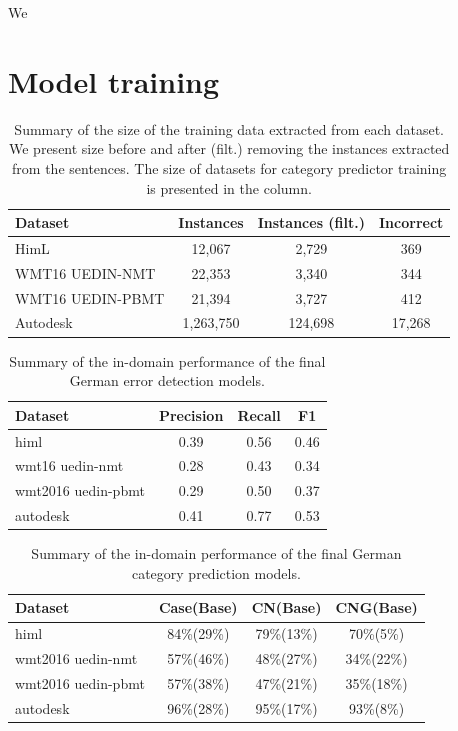 We

\section{Model training}

\begin{table}[t]
\centering
\small

\begin{tabular}{lccc}
Dataset  &  \hash{} Instances  &  \hash{} Instances (filt.)  &  \hash{} Incorrect  \\
\hline
HimL  & 12,067  &  2,729  &  369  \\
WMT16 UEDIN-NMT  &  22,353  &  3,340  &  344  \\
WMT16 UEDIN-PBMT  &  21,394  &   3,727  &  412  \\
Autodesk  &  1,263,750  &  124,698  &  17,268  \\
\end{tabular}
\caption{
    Summary of the size of the training data extracted from each dataset. We present
size before and after (filt.) removing the instances extracted from the  sentences.
The size of datasets for category predictor training is presented in the  column.
}
\label{wf-training-sum}
\end{table}


\begin{table}[t]
\centering
\small

\begin{tabular}{l|ccc}
Dataset  &  Precision  &  Recall  &  F1  \\
\hline
himl  &  0.39  &  0.56  &  0.46  \\
wmt16 uedin-nmt  &  0.28  &  0.43  &  0.34  \\
wmt2016 uedin-pbmt  &  0.29  &  0.50  &  0.37  \\
autodesk  &  0.41  &  0.77  &  0.53  \\
\end{tabular}
\caption{
    Summary of the in-domain performance of the final German error detection models.
}
\label{wf_de-summary}
\end{table}

\begin{table}[t]
\centering
\small

\begin{tabular}{l|ccc}
Dataset  &  Case(Base)  &  CN(Base)  & CNG(Base)  \\
\hline
himl  &  84\%(29\%)  &  79\%(13\%)  &  70\%(5\%)  \\
wmt2016 uedin-nmt  &  57\%(46\%)  &  48\%(27\%)  &  34\%(22\%)  \\
wmt2016 uedin-pbmt  &  57\%(38\%)  &  47\%(21\%)  &  35\%(18\%)\\
autodesk  &  96\%(28\%)  &  95\%(17\%)  &  93\%(8\%)  \\

\end{tabular}
\caption{
    Summary of the in-domain performance of the final German category prediction models.
}
\label{cats-summary}
\end{table}


